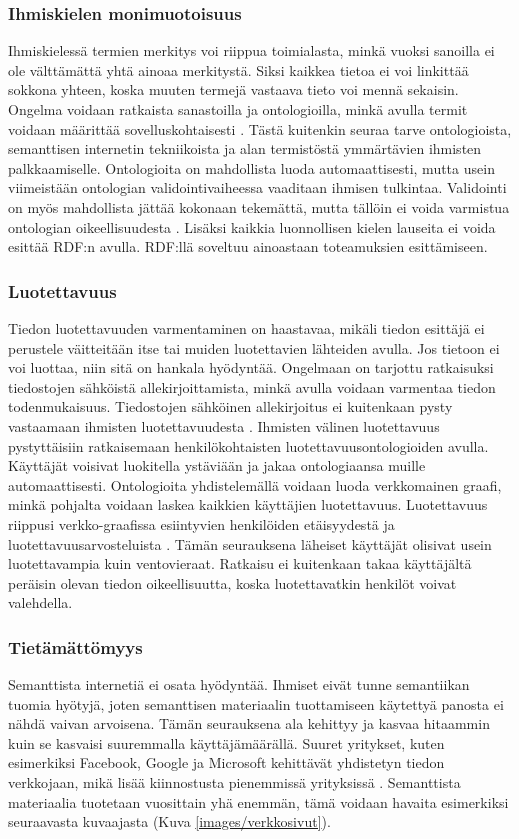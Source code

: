 \documentclass[finnish, 12pt, a4paper, elec, utf8, pdfa, online]{aaltothesis}
\begin{document}
{\subsubsection{Ihmiskielen monimuotoisuus}
Ihmiskielessä termien merkitys voi riippua toimialasta, minkä vuoksi sanoilla ei ole välttämättä yhtä ainoaa merkitystä. Siksi kaikkea tietoa ei voi linkittää sokkona yhteen, koska muuten termejä vastaava tieto voi mennä sekaisin. Ongelma voidaan ratkaista sanastoilla ja ontologioilla, minkä avulla termit voidaan määrittää sovelluskohtaisesti \cite{linked_data_finlad}. Tästä kuitenkin seuraa tarve ontologioista, semanttisen internetin tekniikoista ja alan termistöstä ymmärtävien ihmisten palkkaamiselle. Ontologioita on mahdollista luoda automaattisesti, mutta usein viimeistään ontologian validointivaiheessa vaaditaan ihmisen tulkintaa. Validointi on myös mahdollista jättää kokonaan tekemättä, mutta tällöin ei voida varmistua ontologian oikeellisuudesta \cite{automatic_ontology}. Lisäksi kaikkia luonnollisen kielen lauseita ei voida esittää RDF:n avulla. RDF:llä soveltuu ainoastaan toteamuksien esittämiseen.

\subsubsection{Luotettavuus}
Tiedon luotettavuuden varmentaminen on haastavaa, mikäli tiedon esittäjä ei perustele väitteitään itse tai muiden luotettavien lähteiden avulla. Jos tietoon ei voi luottaa, niin sitä on hankala hyödyntää. Ongelmaan on tarjottu ratkaisuksi tiedostojen sähköistä allekirjoittamista, minkä avulla voidaan varmentaa tiedon todenmukaisuus. Tiedostojen sähköinen allekirjoitus ei kuitenkaan pysty vastaamaan ihmisten luotettavuudesta \cite{trust}. Ihmisten välinen luotettavuus pystyttäisiin ratkaisemaan henkilökohtaisten luotettavuusontologioiden avulla. Käyttäjät voisivat luokitella ystäviään ja jakaa ontologiaansa muille automaattisesti. Ontologioita yhdistelemällä voidaan luoda verkkomainen graafi, minkä pohjalta voidaan laskea kaikkien käyttäjien luotettavuus.
Luotettavuus riippusi verkko-graafissa esiintyvien henkilöiden etäisyydestä ja luotettavuusarvosteluista \cite{trust}. Tämän seurauksena läheiset käyttäjät olisivat usein luotettavampia kuin ventovieraat. Ratkaisu ei kuitenkaan takaa käyttäjältä peräisin olevan tiedon oikeellisuutta, koska luotettavatkin henkilöt voivat valehdella.

\subsubsection{Tietämättömyys}
Semanttista internetiä ei osata hyödyntää. Ihmiset eivät tunne semantiikan tuomia hyötyjä, joten semanttisen materiaalin tuottamiseen käytettyä panosta ei nähdä vaivan arvoisena. Tämän seurauksena ala kehittyy ja kasvaa hitaammin kuin se kasvaisi suuremmalla käyttäjämäärällä. Suuret yritykset, kuten esimerkiksi Facebook, Google ja Microsoft kehittävät yhdistetyn tiedon verkkojaan, mikä lisää kiinnostusta pienemmissä yrityksissä \cite{Facebook} \cite{knowledge_graph} \cite{cortana}. Semanttista materiaalia tuotetaan vuosittain yhä enemmän, tämä voidaan havaita esimerkiksi seuraavasta kuvaajasta (Kuva \ref{images/verkkosivut}).


}
\end{document}
